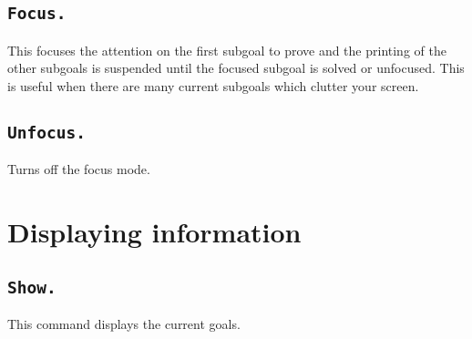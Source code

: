 \begin{ErrMsgs}
\item {}
\end{ErrMsgs}

\subsection[\tt Focus.]{\tt Focus.}
This focuses the attention on the first subgoal to prove and the printing
of the other subgoals is suspended until the focused subgoal is
solved or unfocused. This is useful when there are many current
subgoals which clutter your screen.


\subsection[\tt Unfocus.]{\tt Unfocus.}
Turns off the focus mode.


\section{Displaying information}

\subsection[\tt Show.]{\tt Show.\label{Show}}
This command displays the current goals.

